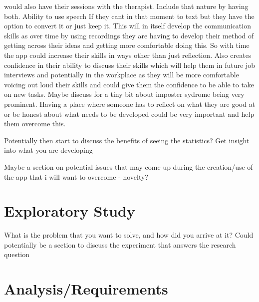 \documentclass{l4proj}
\begin{document}
would also have their sessions with the therapist. Include that nature by having both. Ability to use speech If
they cant in that moment to text but they have the option to convert it or just keep it. This will in itself
develop the communication skills as over time by using recordings they are having to develop their method
of getting across their ideas and getting more comfortable doing this. So with time the app could increase their
skills in ways other than just reflection. Also creates confidence in their ability to discuss their 
skills which will help them in future job interviews and potentially in the workplace as they will be more 
comfortable voicing out loud their skills and could give them the confidence to be able to take on new tasks.
Maybe discuss for a tiny bit about imposter sydrome being very prominent. Having a place where someone has to 
reflect on what they are good at or be honest about what needs to be developed could be very important and
help them overcome this. 
\par 
Potentially then start to discuss the benefits of seeing the statistics? Get insight into what you are 
developing
\par 
Maybe a section on potential issues that may come up during the creation/use of the app that i will want to 
overcome - novelty? 


\chapter{Exploratory Study}
What is the problem that you want to solve, and how did you arrive at it?
Could potentially be a section to discuss the experiment that answers the research question 


\chapter{Analysis/Requirements}
\end{document}
